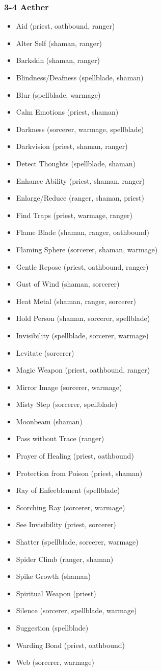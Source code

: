 \subsubsection{3-4 Aether}
\begin{itemize}
\item Aid (priest, oathbound, ranger)
\item Alter Self (shaman, ranger)
\item Barkskin (shaman, ranger)
\item Blindness/Deafness (spellblade, shaman)
\item Blur (spellblade, warmage)
\item Calm Emotions (priest, shaman)
\item Darkness (sorcerer, warmage, spellblade)
\item Darkvision (priest, shaman, ranger)
\item Detect Thoughts (spellblade, shaman)
\item Enhance Ability (priest, shaman, ranger)
\item Enlarge/Reduce (ranger, shaman, priest)
\item Find Traps (priest, warmage, ranger)
\item Flame Blade (shaman, ranger, oathbound)
\item Flaming Sphere (sorcerer, shaman, warmage)
\item Gentle Repose (priest, oathbound, ranger)
\item Gust of Wind (shaman, sorcerer)
\item Heat Metal (shaman, ranger, sorcerer)
\item Hold Person (shaman, sorcerer, spellblade)
\item Invisibility (spellblade, sorcerer, warmage)
\item Levitate (sorcerer)
\item Magic Weapon (priest, oathbound, ranger)
\item Mirror Image (sorcerer, warmage)
\item Misty Step (sorcerer, spellblade)
\item Moonbeam (shaman)
\item Pass without Trace (ranger)
\item Prayer of Healing (priest, oathbound)
\item Protection from Poison (priest, shaman)
\item Ray of Enfeeblement (spellblade)
\item Scorching Ray (sorcerer, warmage)
\item See Invisibility (priest, sorcerer)
\item Shatter (spellblade, sorcerer, warmage)
\item Spider Climb (ranger, shaman)
\item Spike Growth (shaman)
\item Spiritual Weapon (priest)
\item Silence (sorcerer, spellblade, warmage)
\item Suggestion (spellblade)
\item Warding Bond (priest, oathbound)
\item Web (sorcerer, warmage)
\end{itemize}

